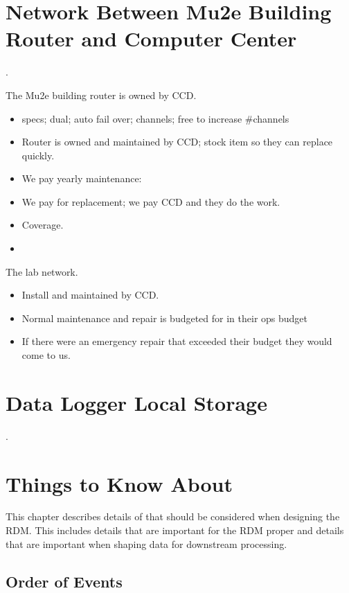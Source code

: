 
\chapter{Network Between Mu2e Building Router and Computer Center}
\label{app:RouterAndNetwork}.

The Mu2e building router is owned by CCD.
\begin{itemize}
\item specs; dual; auto fail over; channels; free to increase \#channels
\item Router is owned and maintained by CCD; stock item so they can replace quickly.
\item We pay yearly maintenance: 
\item We pay for replacement; we pay CCD and they do the work. 
\item {} Coverage.
\item {}
\end{itemize}


The lab network.
\begin{itemize}
\item Install and maintained by CCD.
\item Normal maintenance and repair is budgeted for in their ops budget
\item If there were an emergency repair that exceeded their budget they would come to us. 
\end{itemize}

\chapter{Data Logger Local Storage}
\label{app:DataLoggerLocalStorage}

.

\chapter{Things to Know About \art}

This chapter describes details of \art that should be considered when
designing the RDM.  This includes details that are important for the RDM
proper and details that are important when shaping data for downstream
processing.

\section{Order of Events}


\clearpage
{}
{}
\printbibliography


